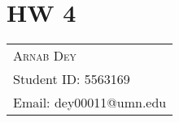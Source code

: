 \section{HW 4}
\begin{tabularx}{\textwidth}{l}
	\hspace*{-0.8cm}\large\textsc{Arnab Dey}\\
	\hspace*{-0.8cm}Student ID: 5563169\\
	\hspace*{-0.8cm}Email: dey00011@umn.edu\\
\end{tabularx}
\bigskip
\par